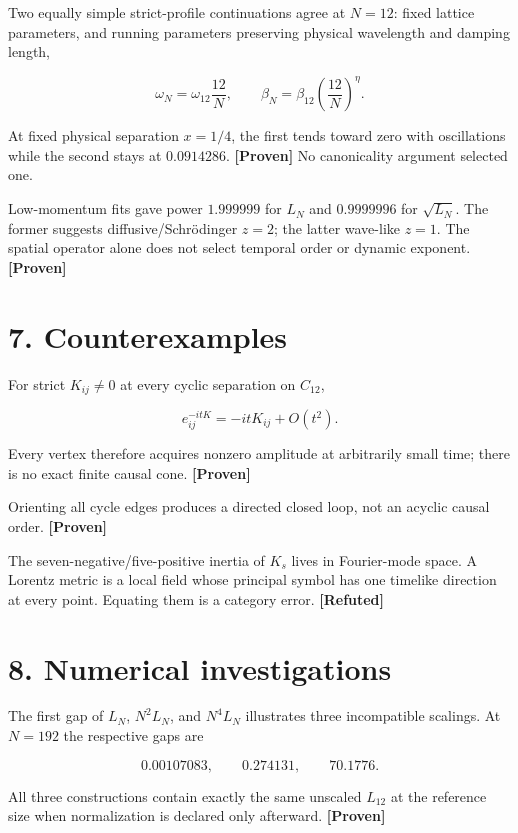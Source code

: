 \documentclass[11pt,a4paper,openany]{report}
\newcommand{\statusProven}{\textcolor{fingreen}{[Proven]}}
\newcommand{\statusRefuted}{\textcolor{finred}{[Refuted]}}
\begin{document}
Two equally simple strict-profile continuations agree at \(N=12\): fixed lattice parameters, and running parameters preserving physical wavelength and damping length,

\[
\omega_N=\omega_{12}\frac{12}{N},\qquad
\beta_N=\beta_{12}\left(\frac{12}{N}\right)^\eta.
\]

At fixed physical separation \(x=1/4\), the first tends toward zero with oscillations while the second stays at \(0.0914286\). \textbf{\statusProven{}} No canonicality argument selected one.

Low-momentum fits gave power \(1.999999\) for \(L_N\) and \(0.9999996\) for \(\sqrt{L_N}\). The former suggests diffusive/\allowbreak{}Schrödinger \(z=2\); the latter wave-like \(z=1\). The spatial operator alone does not select temporal order or dynamic exponent. \textbf{\statusProven{}}

\section{7. Counterexamples}

For strict \(K_{ij}\ne0\) at every cyclic separation on \(C_{12}\),

\[
e^{-itK}_{ij}=-itK_{ij}+O(t^2).
\]

Every vertex therefore acquires nonzero amplitude at arbitrarily small time; there is no exact finite causal cone. \textbf{\statusProven{}}

Orienting all cycle edges produces a directed closed loop, not an acyclic causal order. \textbf{\statusProven{}}

The seven-negative/\allowbreak{}five-positive inertia of \(K_s\) lives in Fourier-mode space. A Lorentz metric is a local field whose principal symbol has one timelike direction at every point. Equating them is a category error. \textbf{\statusRefuted{}}

\section{8. Numerical investigations}

The first gap of \(L_N\), \(N^2L_N\), and \(N^4L_N\) illustrates three incompatible scalings. At \(N=192\) the respective gaps are

\[
0.00107083,\qquad 0.274131,\qquad 70.1776.
\]

All three constructions contain exactly the same unscaled \(L_{12}\) at the reference size when normalization is declared only afterward. \textbf{\statusProven{}}
\end{document}

